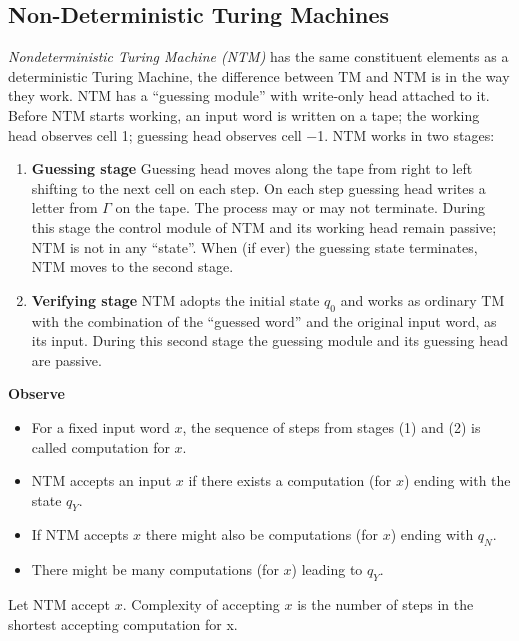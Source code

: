 \subsection{Non-Deterministic Turing Machines}
\begin{definition}
    \textit{Nondeterministic Turing Machine (NTM)} has
    the same constituent elements as a deterministic Turing Machine,
    the difference between TM and NTM is in the way they work.
    NTM has a “guessing module” with write-only head attached to it.
    Before NTM starts working, an input word is written on a tape;
    the working head observes cell 1; guessing head observes cell −1.
    NTM works in two stages:
    \begin{enumerate}
        \item \textbf{Guessing stage}
            Guessing head moves along the tape from right to left
            shifting to the next cell on each step.
            On each step guessing head writes a letter from $\Gamma$ on the tape.
            The process may or may not terminate.
            During this stage the control module of NTM and its working head remain passive;
            NTM is not in any “state”. When (if ever) the guessing state terminates, NTM moves to the second stage.
        \item \textbf{Verifying stage}
            NTM adopts the initial state $q_0$ and works as ordinary TM
            with the combination of the “guessed word” and the original input word, as its input.
            During this second stage the guessing module and its guessing head are passive.
    \end{enumerate}
    \textbf{Observe}
    \begin{itemize}
        \item For a fixed input word $x$, the sequence of steps from stages (1) and (2) is called computation for $x$.
        \item NTM accepts an input $x$ if there exists a computation (for $x$) ending with the state $q_Y$.
        \item If NTM accepts $x$ there might also be computations (for $x$) ending with $q_N$.
        \item There might be many computations (for $x$) leading to $q_Y$.
    \end{itemize}
\end{definition}
\begin{definition}
    Let NTM accept $x$.
    Complexity of accepting $x$ is the number of steps in the shortest accepting computation for x.
\end{definition}
